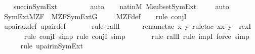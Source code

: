 \begin{isabellebody}
\ \ \isamarkupfalse%
\ succ{\isacharunderscore}{\kern0pt}in{\isacharunderscore}{\kern0pt}SymExt\ \isanewline
\ \ \ \ \ \ \isamarkupfalse%
\ auto{\isacharbrackleft}{\kern0pt}{}{\isacharbrackright}{\kern0pt}\isanewline
\ \ \isamarkupfalse%
\ nat{\isacharunderscore}{\kern0pt}in{\isacharunderscore}{\kern0pt}M\ M{\isacharunderscore}{\kern0pt}subset{\isacharunderscore}{\kern0pt}SymExt\ \isanewline
\ \ \isamarkupfalse%
\ auto%
\endisatagproof
{\isafoldproof}%
%
\isadelimproof
\isanewline
%
\endisadelimproof
\isanewline
{}\isamarkupfalse%
\ SymExt{\isacharunderscore}{\kern0pt}M{\isacharunderscore}{\kern0pt}ZF\ {\isacharcolon}{\kern0pt}\ {\isachardoublequoteopen}M{\isacharunderscore}{\kern0pt}ZF{\isacharparenleft}{\kern0pt}SymExt{\isacharparenleft}{\kern0pt}G{\isacharparenright}{\kern0pt}{\isacharparenright}{\kern0pt}{\isachardoublequoteclose}\ \isanewline
%
\isadelimproof
\ \ %
\endisadelimproof
%
\isatagproof
{}\isamarkupfalse%
\ M{\isacharunderscore}{\kern0pt}ZF{\isacharunderscore}{\kern0pt}def\ \isanewline
\ \ \isamarkupfalse%
{\isacharparenleft}{\kern0pt}rule\ conjI{\isacharparenright}{\kern0pt}{\isacharplus}{\kern0pt}\isanewline
\ \ \isamarkupfalse%
\ upair{\isacharunderscore}{\kern0pt}ax{\isacharunderscore}{\kern0pt}def\ upair{\isacharunderscore}{\kern0pt}def\ \isanewline
\ \ \ \ \ \isamarkupfalse%
{\isacharparenleft}{\kern0pt}rule\ rallI{\isacharparenright}{\kern0pt}{\isacharplus}{\kern0pt}\isanewline
\ \ \ \ \ \isamarkupfalse%
{\isacharparenleft}{\kern0pt}rename{\isacharunderscore}{\kern0pt}tac\ x\ y{\isacharcomma}{\kern0pt}\ rule{\isacharunderscore}{\kern0pt}tac\ x{\isacharequal}{\kern0pt}{\isachardoublequoteopen}{\isacharbraceleft}{\kern0pt}x{\isacharcomma}{\kern0pt}\ y{\isacharbraceright}{\kern0pt}{\isachardoublequoteclose}\ \ rexI{\isacharparenright}{\kern0pt}\isanewline
\ \ \ \ \ \ \isamarkupfalse%
{\isacharparenleft}{\kern0pt}rule\ conjI{\isacharcomma}{\kern0pt}\ simp{\isacharcomma}{\kern0pt}\ rule\ conjI{\isacharcomma}{\kern0pt}\ simp{\isacharparenright}{\kern0pt}\isanewline
\ \ \ \ \ \ \isamarkupfalse%
{\isacharparenleft}{\kern0pt}rule\ rallI{\isacharcomma}{\kern0pt}\ rule\ impI{\isacharcomma}{\kern0pt}\ force{\isacharcomma}{\kern0pt}\ simp{\isacharparenright}{\kern0pt}\isanewline
\ \ \ \ \ \isamarkupfalse%
{\isacharparenleft}{\kern0pt}rule\ upair{\isacharunderscore}{\kern0pt}in{\isacharunderscore}{\kern0pt}SymExt{\isacharparenright}{\kern0pt}\isanewline

\end{isabellebody}
